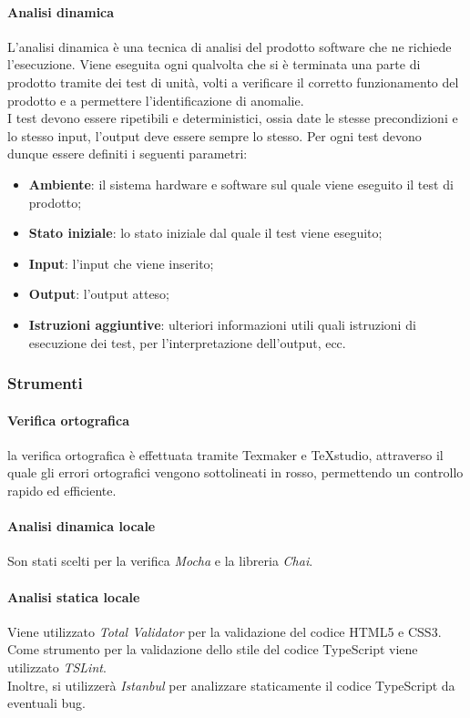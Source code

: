 \documentclass[11pt,a4paper]{article}
\begin{document}
{	\paragraph{Analisi dinamica\\}
	L'analisi dinamica è una tecnica di analisi del prodotto software che ne richiede l'esecuzione. Viene eseguita ogni qualvolta che si è terminata una parte di prodotto tramite dei test di unità, volti a verificare il corretto funzionamento del prodotto e a permettere l'identificazione di anomalie. \\
	I test devono essere ripetibili e deterministici, ossia date le stesse precondizioni e lo stesso input, l'output deve essere sempre lo stesso. Per ogni test devono dunque essere definiti i seguenti parametri:
	\begin{itemize}
		\item \textbf{Ambiente}: il sistema hardware e software sul quale viene eseguito il test di prodotto;
		\item \textbf{Stato iniziale}: lo stato iniziale dal quale il test viene eseguito;
		\item \textbf{Input}: l'input che viene inserito;
		\item \textbf{Output}: l'output atteso;
		\item \textbf{Istruzioni aggiuntive}: ulteriori informazioni utili quali istruzioni di esecuzione dei test, per l'interpretazione dell'output, ecc. 
	\end{itemize}
		
	\subsubsection{Strumenti}	
	\paragraph{Verifica ortografica\\}
	la verifica ortografica è effettuata tramite Texmaker e TeXstudio, attraverso il quale gli errori ortografici vengono sottolineati in rosso, permettendo un controllo rapido ed efficiente.
	\paragraph{Analisi dinamica locale\\}
	Son stati scelti per la verifica \textit{Mocha} e la libreria \textit{Chai}. 
	\paragraph{Analisi statica locale\\}
	Viene utilizzato \textit{Total Validator} per la validazione del codice HTML5 e CSS3. \\
	Come strumento per la validazione dello stile del codice TypeScript viene utilizzato \textit{TSLint}. \\
	Inoltre, si utilizzerà \textit{Istanbul} per analizzare staticamente il codice TypeScript da eventuali bug.
	
}
\end{document}
